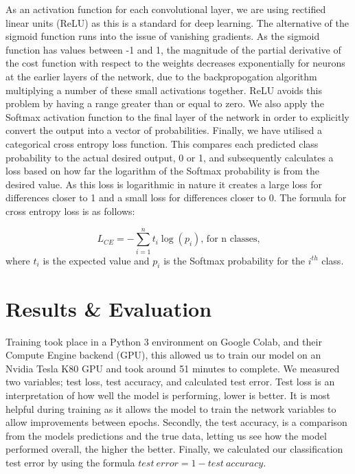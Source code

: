 \documentclass[journal]{IEEEtran}
\begin{document}
As an activation function for each convolutional layer, we are using rectified linear units (ReLU) as this is a standard for deep learning. The alternative of the sigmoid function runs into the issue of vanishing gradients. As the sigmoid function has values between -1 and 1, the magnitude of the partial derivative of the cost function with respect to the weights decreases exponentially for neurons at the earlier layers of the network, due to the backpropogation algorithm multiplying a number of these small activations together. ReLU avoids this problem by having a range greater than or equal to zero. We also apply the Softmax activation function to the final layer of the network in order to explicitly convert the output into a vector of probabilities. Finally, we have utilised a categorical cross entropy loss function. This compares each predicted class probability to the actual desired output, 0 or 1, and subsequently calculates a loss based on how far the logarithm of the Softmax probability is from the desired value. As this loss is logarithmic in nature it creates a large loss for differences closer to 1 and a small loss for differences closer to 0. The formula for cross entropy loss is as follows:

\[L_{CE} = - \sum_{i=1}^{n} t_i \log {(p_i)}\textrm{, for n classes,} \]where \(t_i\) is the expected value and \(p_i\) is the Softmax probability for the \(i^{th}\) class.




\section{Results \& Evaluation}

Training took place in a Python 3 environment on Google Colab, and their Compute Engine backend (GPU), this allowed us to train our model on an Nvidia Tesla K80 GPU and took around 51 minutes to complete. We measured two variables; test loss, test accuracy, and calculated test error. Test loss is an interpretation of how well the model is performing, lower is better. It is most helpful during training as it allows the model to train the network variables to allow improvements between epochs. Secondly, the test accuracy, is a comparison from the models predictions and the true data, letting us see how the model performed overall, the higher the better. Finally, we calculated our classification test error by using the formula \( test\ error = 1 - test\ accuracy\).
\end{document}
